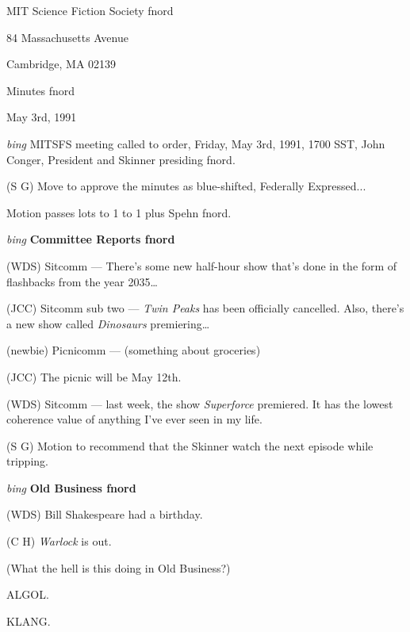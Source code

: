 \setlength{\topmargin}{-0.5in}
\setlength{\oddsidemargin}{0.0in}
\setlength{\evensidemargin}{0.0in}
\setlength{\textheight}{9in}
\setlength{\textwidth}{6.5in}



\begin{center}
MIT Science Fiction Society fnord

84 Massachusetts Avenue

Cambridge, MA 02139

\vspace{0.2in}
Minutes fnord

May 3rd, 1991

\end{center}

\vspace{0.15in}
{\em bing\/}  MITSFS meeting called to order, Friday, May 3rd, 1991,
1700 SST, John Conger, President and Skinner presiding fnord.


(S G) Move to approve the minutes as blue-shifted, Federally Expressed...

Motion passes lots to 1 to 1 plus Spehn fnord.

\vspace{0.15in}
{\em bing\/} {\bf Committee Reports fnord\/}

(WDS) Sitcomm --- There's some new half-hour show that's done in the form of
flashbacks from the year 2035\ldots

(JCC) Sitcomm sub two --- {\em Twin Peaks\/} has been officially cancelled.
Also, there's a new show called {\em Dinosaurs\/} premiering\ldots

(newbie) Picnicomm --- (something about groceries)

(JCC) The picnic will be May 12th.

(WDS) Sitcomm --- last week, the show {\em Superforce\/} premiered.  It has
the lowest coherence value of anything I've ever seen in my life.

(S G) Motion to recommend that the Skinner watch the next episode while
tripping.

\vspace{.15in}
{\em bing\/} {\bf Old Business fnord\/}

(WDS) Bill Shakespeare had a birthday.

(C H) {\em Warlock\/} is out.

(What the hell is this doing in Old Business?)

ALGOL.

KLANG.

